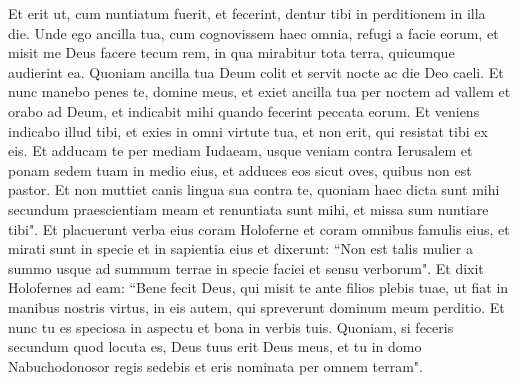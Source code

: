 \begin{biblechapter}
\verse Et erit ut, cum nuntiatum fuerit, et fecerint, dentur tibi in perditionem in illa die. 
\verse Unde ego ancilla tua, cum cognovissem haec omnia, refugi a facie eorum, et misit me Deus facere tecum rem, in qua mirabitur tota terra, quicumque audierint ea. 
\verse Quoniam ancilla tua Deum colit et servit nocte ac die Deo caeli. Et nunc manebo penes te, domine meus, et exiet ancilla tua per noctem ad vallem et orabo ad Deum, et indicabit mihi quando fecerint peccata eorum. 
\verse Et veniens indicabo illud tibi, et exies in omni virtute tua, et non erit, qui resistat tibi ex eis. 
\verse Et adducam te per mediam Iudaeam, usque veniam contra Ierusalem et ponam sedem tuam in medio eius, et adduces eos sicut oves, quibus non est pastor. Et non muttiet canis lingua sua contra te, quoniam haec dicta sunt mihi secundum praescientiam meam et renuntiata sunt mihi, et missa sum nuntiare tibi". 
\verse Et placuerunt verba eius coram Holoferne et coram omnibus famulis eius, et mirati sunt in specie et in sapientia eius et dixerunt: 
\verse “Non est talis mulier a summo usque ad summum terrae in specie faciei et sensu verborum".  
\verse Et dixit Holofernes ad eam: “Bene fecit Deus, qui misit te ante filios plebis tuae, ut fiat in manibus nostris virtus, in eis autem, qui spreverunt dominum meum perditio. 
\verse Et nunc tu es speciosa in aspectu et bona in verbis tuis. Quoniam, si feceris secundum quod locuta es, Deus tuus erit Deus meus, et tu in domo Nabuchodonosor regis sedebis et eris nominata per omnem terram". 
\end{biblechapter}

